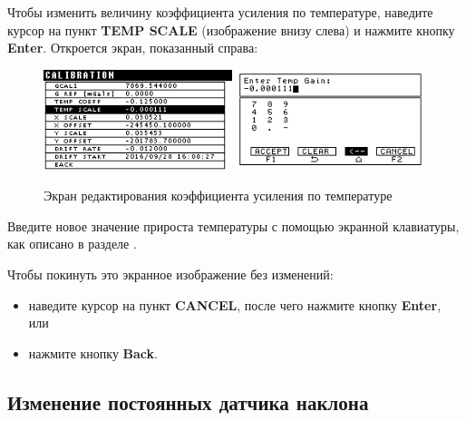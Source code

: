 Чтобы изменить величину коэффициента усиления по температуре, наведите курсор на
пункт \textbf{TEMP SCALE} (изображение внизу слева) и нажмите кнопку
\textbf{Enter}.  Откроется экран, показанный справа:

\begin{figure}[H]
  \centering
  \includegraphics[width=0.49\textwidth]{figures/the_temperature_gain_editing_screen_1}
  \includegraphics[width=0.49\textwidth]{figures/the_temperature_gain_editing_screen_2}
  \caption{Экран редактирования коэффициента усиления по температуре}
  \label{fig:the_temperature_gain_editing_screen}
\end{figure}

Введите новое значение прироста температуры с помощью экранной клавиатуры,
как описано в разделе .

Чтобы покинуть это экранное изображение без изменений:
\begin{itemize}
  \item наведите курсор на пункт \textbf{CANCEL}, после чего нажмите кнопку
    \textbf{Enter}, или

  \item нажмите кнопку \textbf{Back}.
\end{itemize}

\subsection{Изменение постоянных датчика наклона}


